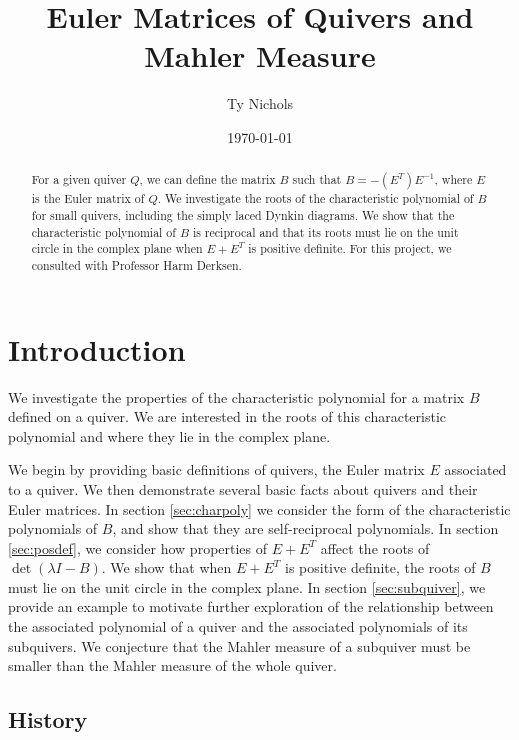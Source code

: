 \documentclass{amsart}
\theoremstyle{theorem}
\theoremstyle{theorem*}
\theoremstyle{definition}
\begin{document}
\date{\today}
\title[Euler Matrices and Mahler Measure] {Euler Matrices of Quivers and Mahler Measure}
\author[T. Nichols]{Ty Nichols}
\address{Department of Mathematics, Northeastern University, Boston,
    Massachusetts~02115}
\begin{abstract} For a given quiver $Q$, we can define the matrix $B$ such that
    $B = -(E^T)E^{-1}$, where $E$ is the Euler matrix of $Q$. We investigate
    the roots of the characteristic polynomial of $B$ for
    small quivers, including the simply laced Dynkin diagrams. We show that
    the characteristic polynomial of $B$ is reciprocal and that its roots must
    lie on the unit circle in the complex plane when $E + E^T$ is positive definite.
    For this project, we consulted with Professor Harm Derksen.
\end{abstract}
\maketitle

\section{Introduction}
\label{sec:intro}

We investigate the properties of the characteristic polynomial for a matrix $B$ defined
on a quiver. We are interested in the roots of this characteristic polynomial
and where they lie in the complex plane.

We begin by providing basic definitions of quivers, the Euler matrix $E$
associated to a quiver. We then demonstrate several basic facts about quivers
and their Euler matrices. In section \ref{sec:charpoly} we consider the form of the characteristic 
polynomials of $B$, and show that they are self-reciprocal polynomials. 
In section \ref{sec:posdef}, we consider how properties of $E + E^T$
affect the roots of $\det(\lambda I - B)$.
We show that when $E + E^T$ is positive definite, the roots of $B$ must
lie on the unit circle in the complex plane.
In section \ref{sec:subquiver}, we provide an example to motivate further
exploration of the relationship between the associated polynomial of a
quiver and the associated polynomials of its subquivers. We conjecture
that the Mahler measure of a subquiver must be smaller than the Mahler
measure of the whole quiver.

\subsection{History}
\end{document}
